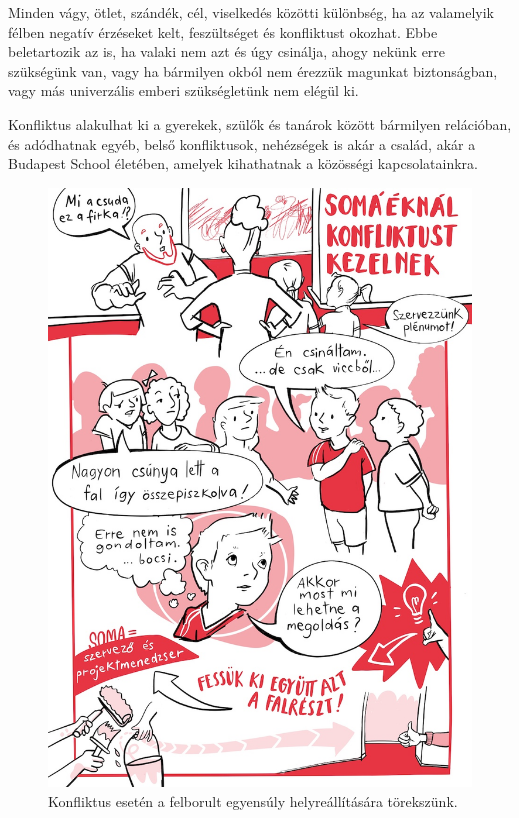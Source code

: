 Minden vágy, ötlet, szándék, cél, viselkedés közötti különbség, ha az
valamelyik félben negatív érzéseket kelt, feszültséget és konfliktust
okozhat. Ebbe beletartozik az is, ha valaki nem azt és úgy csinálja,
ahogy nekünk erre szükségünk van, vagy ha bármilyen okból nem érezzük
magunkat biztonságban, vagy más univerzális emberi szükségletünk
{\autocite{Rosenberg2003}} nem elégül ki.

Konfliktus alakulhat ki a gyerekek, szülők és tanárok között bármilyen
relációban, és adódhatnak egyéb, belső konfliktusok, nehézségek is akár
a család, akár a Budapest School életében, amelyek kihathatnak a
közösségi kapcsolatainkra.

\begin{figure}
\centering
\includegraphics{pics/5a_konfliktus.jpg}
\caption{Konfliktus esetén a felborult egyensúly helyreállítására törekszünk.}
\end{figure}

